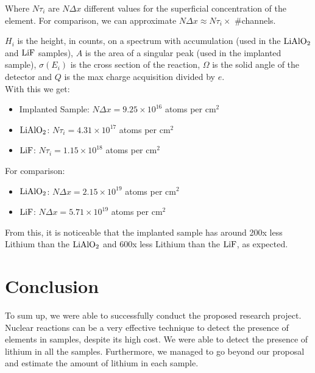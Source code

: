 \documentclass{article}
\begin{document}
\begin{multicols}{2}
\vspace{4mm}

Where $N\tau_i$ are $N\Delta x$ different values for the superficial concentration of the element. For comparison, we can approximate $N\Delta x \approx N\tau_i \times$ \#channels.

$H_i$ is the height, in counts, on a spectrum with accumulation (used in the $\ce{LiAlO2}$ and $\ce{LiF}$ samples), $A$ is the area of a singular peak (used in the implanted sample), $\sigma (E_i) $ is the cross section of the reaction, $\Omega$ is the solid angle of the detector and $Q$ is the max charge acquisition divided by $e$.\\

With this we get:
\begin{itemize}[noitemsep, left=1cm]
    \item Implanted Sample: $N\Delta x = 9.25\times 10^{16}$ atoms per cm$^2$\\
    \item $\ce{LiAlO2}$: $N\tau_i=4.31\times10^{17}$ atoms per cm$^2$\\
    \item $\ce{LiF}$: $N\tau_i=1.15\times10^{18}$ atoms per cm$^2$
\end{itemize}

For comparison:
\begin{itemize}[noitemsep, left=1cm]
\item $\ce{LiAlO2}$: $N\Delta x=2.15\times10^{19}$ atoms per cm$^2$\\
\item $\ce{LiF}$: $N\Delta x=5.71\times10^{19}$ atoms per cm$^2$\\
\end{itemize}

From this, it is noticeable that the implanted sample has around 200x less Lithium than the $\ce{LiAlO2}$ and 600x less Lithium than the $\ce{LiF}$, as expected.

\section{Conclusion}
    \label{sec:conclusion}

To sum up, we were able to successfully conduct the proposed research project.
Nuclear reactions can be a very effective technique to detect the presence of elements in samples, despite its high cost.
We were able to detect the presence of lithium in all the samples. 
Furthermore, we managed to go beyond our proposal and estimate the amount of lithium in each sample.

\nocite{*}
\printbibliography


\end{multicols}
\end{document}
